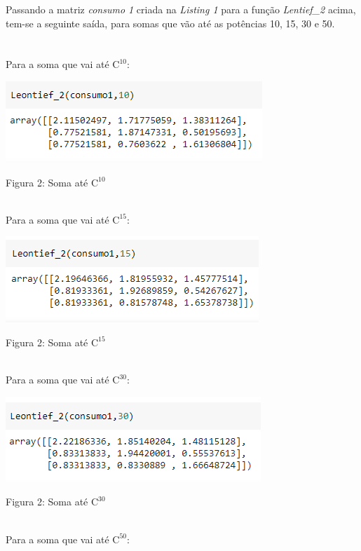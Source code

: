 \documentclass[a4paper, 12pt]{article}
\begin{document}
Passando a matriz \textit{consumo 1} criada na \textit{Listing 1} para a função \textit{Lentief\_2} acima, tem-se a seguinte saída, para somas que vão até as potências 10, 15, 30 e 50.\\\\\\

Para a soma que vai até $\mathrm{C^{10}}$:

 \begin{center}
    \includegraphics{pot_10.PNG}
    
    Figura 2: Soma até $\mathrm{C^{10}}$
\end{center}\\

Para a soma que vai até $\mathrm{C^{15}}$:

 \begin{center}
    \includegraphics{pot_15.PNG}
    
    Figura 2: Soma até $\mathrm{C^{15}}$
\end{center}\\

Para a soma que vai até $\mathrm{C^{30}}$:

 \begin{center}
    \includegraphics{pot_30.PNG}
    
    Figura 2: Soma até $\mathrm{C^{30}}$
\end{center}\\

Para a soma que vai até $\mathrm{C^{50}}$:
\end{document}
